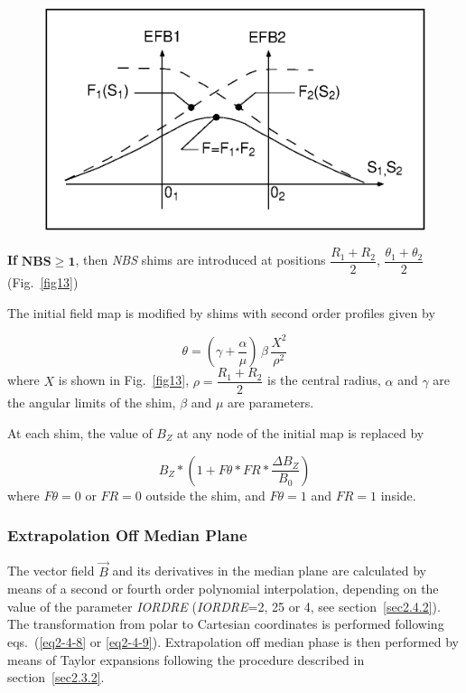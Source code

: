 \vfill
\begin{figure}[H]
\centerline{\includegraphics[width=12cm]{Fig12.ps}}
{\setlength{\captionwidth}{15cm}
}
\end{figure}

\newpage


\noindent\textbf{If } $\mathbf{NBS \geq 1}$, then \textsl{NBS} shims are introduced at
positions $ \dfrac{R_1+R_2 }{ 2}$, $\dfrac{\theta_ 1+\theta_ 2 }{ 2} $  
(Fig.~\ref{fig13})~\cite{Biblio13}  %

\noindent The initial field map is modified by shims with second order
profiles given by 

$$ \theta  = \left(\gamma  + \frac{\alpha }{ \mu} \right) 
       \,\beta  \, \frac{X^2 }{\rho^ 2} $$
%
 where $ X $ is shown in  Fig.~\ref{fig13},  
 $ \rho =\dfrac{R_1+R_2 }{ 2}$ is 
the central radius, $\alpha$ and $\gamma$ are the angular limits of the shim, 
$\beta$ and $\mu$ are parameters. 

\noindent At each shim, the value of $ B_Z $ at any node of the initial map is
replaced by 

$$ B_Z \ast  \left(1+F\theta  \ast  FR \ast  \frac{\Delta B_Z }{ B_0} \right)
$$
%
 where $ F\theta =0 $ or $ FR=0 $ outside the shim, and $ F\theta =1$ and $ FR=1 $ inside.  

\subsubsection*{Extrapolation Off Median Plane} 

The vector field $ \vec  B $ and its derivatives in the median plane are 
calculated by means of a second or fourth order polynomial 
interpolation, depending 
on the value of the parameter \textsl{IORDRE} (\textsl{IORDRE}=2, 25 or 4, 
see section~\ref{sec2.4.2}). 
The transformation from polar to Cartesian coordinates is performed 
following eqs.~(\ref{eq2-4-8} or \ref{eq2-4-9}). Extrapolation off median phase is then performed 
by means of Taylor expansions following the procedure described in section~\ref{sec2.3.2}.  


